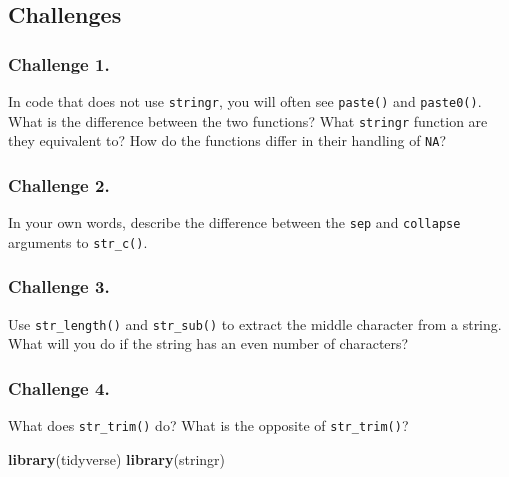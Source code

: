 \documentclass[]{book}
\newenvironment{Shaded}{\begin{snugshade}}{\end{snugshade}}
\newcommand{\KeywordTok}[1]{\textcolor[rgb]{0.13,0.29,0.53}{\textbf{#1}}}
\newcommand{\NormalTok}[1]{#1}
\begin{document}
\subsection{Challenges}\label{challenges-14}

\subsubsection*{Challenge 1.}\label{challenge-1.-11}

In code that does not use \texttt{stringr}, you will often see
\texttt{paste()} and \texttt{paste0()}. What is the difference between
the two functions? What \texttt{stringr} function are they equivalent
to? How do the functions differ in their handling of \texttt{NA}?

\subsubsection*{Challenge 2.}\label{challenge-2.-10}

In your own words, describe the difference between the \texttt{sep} and
\texttt{collapse} arguments to \texttt{str\_c()}.

\subsubsection*{Challenge 3.}\label{challenge-3.-7}

Use \texttt{str\_length()} and \texttt{str\_sub()} to extract the middle
character from a string. What will you do if the string has an even
number of characters?

\subsubsection*{Challenge 4.}\label{challenge-4.-3}

What does \texttt{str\_trim()} do? What is the opposite of
\texttt{str\_trim()}?

\begin{Shaded}
\begin{Highlighting}[]
\KeywordTok{library}\NormalTok{(tidyverse)}
\KeywordTok{library}\NormalTok{(stringr)}
\end{Highlighting}
\end{Shaded}
\end{document}
